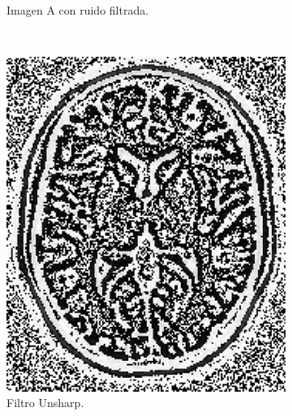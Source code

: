 \documentclass[letterpaper,12pt]{article}
\theoremstyle{plain}
\begin{document}
\begin{figure}[H]
\begin{subfigure}[h]{0.2\textwidth}
           \caption{Imagen A con ruido filtrada.} 
        \end{subfigure}
        \\
        \begin{subfigure}[h]{0.2\textwidth}
           \centering
           \includegraphics[width=\textwidth]{Figuras/unsharp.png}
           \caption{Filtro Unsharp.\\
           $~$} 
        \end{subfigure}
        \begin{subfigure}[h]{0.2\textwidth}
           \centering

\end{subfigure}
\end{figure}
\end{document}

